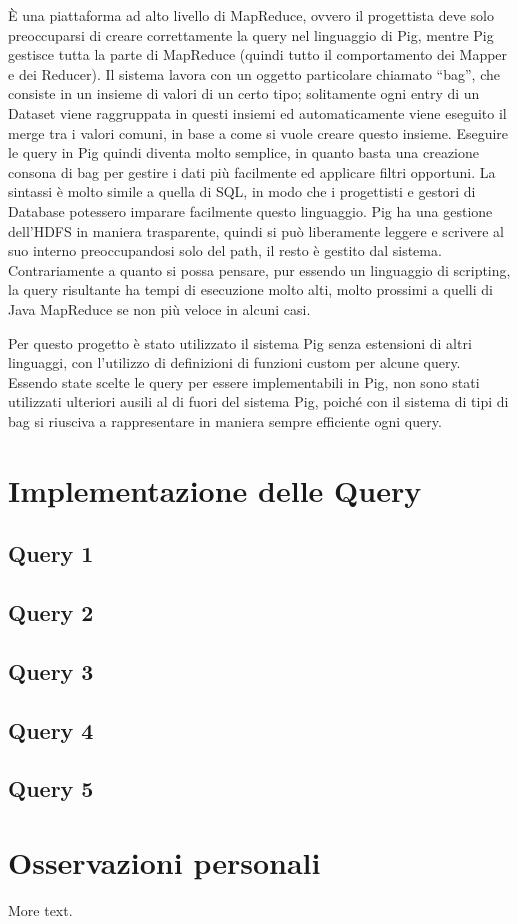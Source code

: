 \documentclass[11pt]{report} %
\begin{document}
 \`E una piattaforma ad alto livello di MapReduce, ovvero il progettista deve solo preoccuparsi di creare correttamente la query nel linguaggio di Pig, mentre Pig gestisce tutta la parte di MapReduce (quindi tutto il comportamento dei Mapper e dei Reducer). Il sistema lavora con un oggetto particolare chiamato ``bag'', che consiste in un insieme di valori di un certo tipo; solitamente ogni entry di un Dataset viene raggruppata in questi insiemi ed automaticamente viene eseguito il merge tra i valori comuni, in base a come si vuole creare questo insieme. Eseguire le query in Pig quindi diventa molto semplice, in quanto basta una creazione consona di bag per gestire i dati più facilmente ed applicare filtri opportuni.  La sintassi è molto simile a quella di SQL, in modo che i progettisti e gestori di Database potessero imparare facilmente questo linguaggio. Pig ha una gestione dell'HDFS in maniera trasparente, quindi si può liberamente leggere e scrivere al suo interno preoccupandosi solo del path, il resto è gestito dal sistema. Contrariamente a quanto si possa pensare, pur essendo un linguaggio di scripting, la query risultante ha tempi di esecuzione molto alti, molto prossimi a quelli di Java MapReduce se non più veloce in alcuni casi.
 
 Per questo progetto è stato utilizzato il sistema Pig senza estensioni di altri linguaggi, con l'utilizzo di definizioni di funzioni custom per alcune query. Essendo state scelte le query per essere implementabili in Pig, non sono stati utilizzati ulteriori ausili al di fuori del sistema Pig, poiché con il sistema di tipi di bag si riusciva a rappresentare in maniera sempre efficiente ogni query.

\section{Implementazione delle Query}

\subsection{Query 1}
\subsection{Query 2}
\subsection{Query 3}
\subsection{Query 4}
\subsection{Query 5}

\section{Osservazioni personali}

More text.
\end{document}
